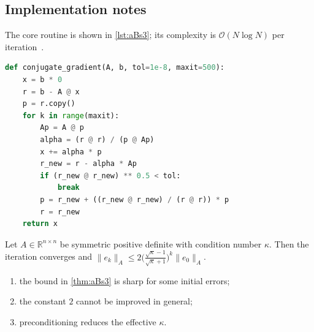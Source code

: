 \lipsum[82-83]

\subsection{Implementation notes}\label{sec:aBs3-i}
The core routine is shown in \cref{lst:aBs3}; its complexity is $\mathcal{O}(N\log N)$ per iteration~\cite{appx-3}.

\begin{lstlisting}[language=python,caption={Reference implementation for aBs3.},label={lst:aBs3}]
def conjugate_gradient(A, b, tol=1e-8, maxit=500):
    x = b * 0
    r = b - A @ x
    p = r.copy()
    for k in range(maxit):
        Ap = A @ p
        alpha = (r @ r) / (p @ Ap)
        x += alpha * p
        r_new = r - alpha * Ap
        if (r_new @ r_new) ** 0.5 < tol:
            break
        p = r_new + ((r_new @ r_new) / (r @ r)) * p
        r = r_new
    return x
\end{lstlisting}

\kant[9-11]
\begin{theorem}\label{thm:aBs3}
Let $A\in\mathbb{R}^{n\times n}$ be symmetric positive definite with condition number $\kappa$. Then the iteration converges and
$\lVert e_k\rVert_A \le 2\bigl(\tfrac{\sqrt\kappa-1}{\sqrt\kappa+1}\bigr)^k\lVert e_0\rVert_A$.
\end{theorem}
\begin{enumerate}[label=(\roman*)]
\item the bound in \cref{thm:aBs3} is sharp for some initial errors;
\item the constant $2$ cannot be improved in general;
\item preconditioning reduces the effective $\kappa$.
\end{enumerate}

\lipsum[104-104]
